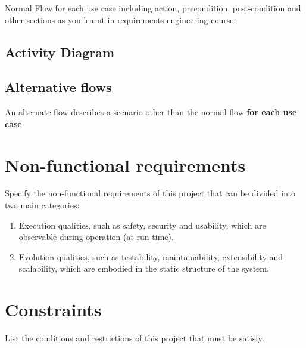 Normal Flow for each use case including action, precondition, post-condition and other sections as you learnt in requirements engineering course.

\subsection{Activity Diagram}

\subsection{Alternative flows}

An alternate flow describes a scenario other than the normal flow \textbf{for each use case}.

\section{Non-functional requirements}

Specify the non-functional requirements of this project that can be divided into two main categories:

\begin{enumerate}
\item Execution qualities, such as safety, security and usability, which are observable during operation (at run time).
\item Evolution qualities, such as testability, maintainability, extensibility and scalability, which are embodied in the static structure of the system.
\end{enumerate}

\section{Constraints}
List the conditions and restrictions of this project that must be satisfy.